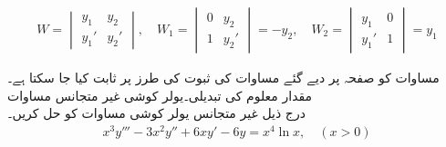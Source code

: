 \begin{align*}
W=
\begin{vmatrix}
y_1& y_2\\[1mm]
y_1'&y_2'
\end{vmatrix}, \quad
W_1=
\begin{vmatrix}
0&y_2\\[1mm]
1&y_2'
\end{vmatrix}=-y_2, \quad
W_2=
\begin{vmatrix}
y_1& 0\\[1mm]
y_1'&1
\end{vmatrix}=y_1
\end{align*}

مساوات  کو صفحہ  پر دیے  گئے 
 مساوات  کی ثبوت کی طرز پر ثابت کیا جا سکتا ہے۔
مقدار معلوم کی تبدیلی۔یولر کوشی غیر متجانس مساوات\\
درج ذیل غیر متجانس یولر کوشی مساوات کو حل کریں۔
\begin{align*}
x^3y'''-3x^2y''+6xy'-6y=x^4\ln x , \quad (x>0) 
\end{align*}

